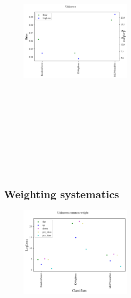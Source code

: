\begin{figure}
	\begin{center}
		\includegraphics[width=0.5\textwidth,height=5.5in]{./fig/Unknown_res.png}
		\caption{}
		\label{fig:unknown_metric_compare}
	\end{center}
\end{figure}

\subsection{Weighting systematics}
\label{sec:weight_res}

\begin{figure}
	\begin{center}
		\includegraphics[width=0.5\textwidth]{./fig/systematic_Unknown_common.png}
		\caption{}
		\label{fig:systematic_common}
	\end{center}
\end{figure}

